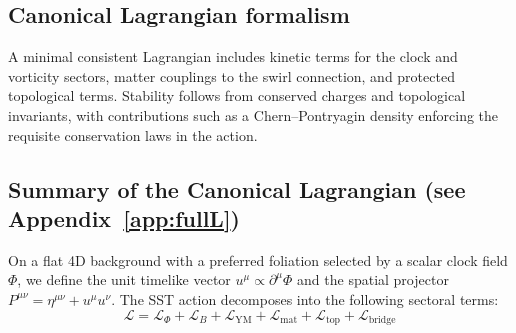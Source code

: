 \documentclass[10pt,reprint,aps,onecolumn,nofootinbib]{revtex4-2}
\begin{document}
    \subsection*{Canonical Lagrangian formalism}
        A minimal consistent Lagrangian includes kinetic terms for the clock and vorticity sectors, matter couplings to the swirl connection, and protected topological terms. Stability follows from conserved charges and topological invariants, with contributions such as a Chern–Pontryagin density enforcing the requisite conservation laws in the action.

    \subsection*{Summary of the Canonical Lagrangian (see Appendix~\ref{app:fullL})}
        On a flat 4D background with a preferred foliation selected by a scalar clock field \(\Phi\), we define the unit timelike vector \(u^\mu \propto \partial^\mu \Phi\) and the spatial projector \(P^{\mu\nu}=\eta^{\mu\nu}+u^\mu u^\nu\). The SST action decomposes into the following sectoral terms:
        \begin{equation}
            \mathcal{L} =
            \mathcal{L}_\Phi
            + \mathcal{L}_B
            + \mathcal{L}_{\mathrm{YM}}
            + \mathcal{L}_{\mathrm{mat}}
            + \mathcal{L}_{\mathrm{top}}
            + \mathcal{L}_{\mathrm{bridge}}
            \label{eq:L_summary}
        \end{equation}
\end{document}
